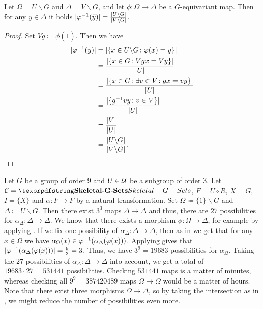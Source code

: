 \begin{lem}\label{lem:size_of_preimages}
Let $\Omega = U \backslash G$ and $\Delta = V \backslash G$, and let $\phi\colon \Omega \to \Delta$ be a $G$-equivariant map. Then for any $\bar y \in \Delta$ it holds ${\lvert\varphi^{-1}(\bar y)\rvert} = \frac{{\lvert U \backslash G \rvert}}{{\lvert V \backslash G \rvert}}$.
\end{lem}
\begin{proof}
Set $Vg \coloneqq \phi(\bar 1)$. Then we have
\begin{align*}
{\lvert\varphi^{-1}(y)\rvert} &= {\lvert\{\bar x \in U \backslash G \colon \varphi(\bar x) = \bar y\}\rvert}\\
 &= \frac{{\lvert\{x \in G \colon Vgx = Vy\}\rvert}}{{\lvert U\rvert}}\\
 &= \frac{{\lvert\{x \in G \colon \exists v \in V\colon gx = vy\}\rvert}}{{\lvert U\rvert}}\\
 &= \frac{{\lvert\{g^{-1} vy \colon v \in V\}\rvert}}{{\lvert U\rvert}}\\
 &= \frac{{\lvert V\rvert}}{{\lvert U\rvert}}\\
 &= \frac{{\lvert U \backslash G \rvert}}{{\lvert V \backslash G \rvert}}.
\end{align*}
\end{proof}

\begin{exmp}
Let $G$ be a group of order $9$ and $U \in \mathcal{U}$ be a subgroup of order $3$. Let $\Ccal = \SkeletalGSets$, $F = U \circ R$, $X = G$, $I = \{X\}$ and $\alpha\colon F \to F$ by a natural transformation. Set $\Omega \coloneqq \{1\} \backslash G$ and $\Delta \coloneqq U \backslash G$. Then there exist $3^3$ maps $\Delta \to \Delta$ and thus, there are $27$ possibilities for $\alpha_\Delta \colon \Delta \to \Delta$. We know that there exists a morphism $\phi\colon \Omega \to \Delta$, for example by applying . If we fix one possibility of $\alpha_\Delta \colon \Delta \to \Delta$, then as in  we get that for any $x \in \Omega$ we have $\alpha_\Omega(x) \in \varphi^{-1}(\alpha_\Delta(\varphi(x)))$. Applying  gives that ${\lvert\varphi^{-1}(\alpha_\Delta(\varphi(x)))\rvert} = \frac 9 3 = 3$. Thus, we have $3^9 = 19683$ possibilities for $\alpha_\Omega$. Taking the $27$ possibilities of $\alpha_\Delta \colon \Delta \to \Delta$ into account, we get a total of $19683 \cdot 27 = 531441$ possibilities. Checking $531441$ maps is a matter of minutes, whereas checking all $9^9 = 387420489$ maps $\Omega \to \Omega$ would be a matter of hours. Note that there exist three morphisms $\Omega \to \Delta$, so by taking the intersection as in , we might reduce the number of possibilities even more.
\end{exmp}

